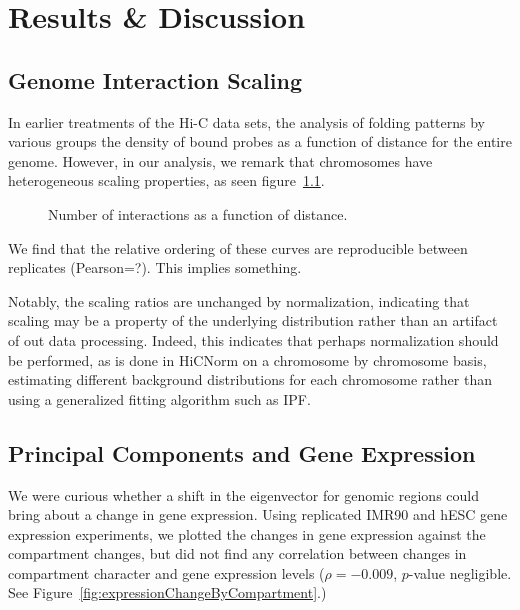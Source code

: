 \chapter{Results \& Discussion}

\section*{Genome Interaction Scaling}
In earlier treatments of the Hi-C data sets, the analysis of folding patterns by various groups \citep{imakaev2012} \citep{dixon2012}
the density of bound probes as a function of distance for the entire genome.  However, in our analysis, we remark that chromosomes
have heterogeneous scaling properties, as seen figure~\ref{fig:interactionScaling}.

\begin{figure}[h]
  \caption{Number of interactions as a function of distance.}\label{fig:interactionScaling}
\end{figure}

We find that the relative ordering of these curves are reproducible between replicates (Pearson=?).  This implies something.

Notably, the scaling ratios are unchanged by normalization, indicating that scaling may be a property of the underlying distribution
rather than an artifact of out data processing.  Indeed, this indicates that perhaps normalization should be performed, as is
done in HiCNorm \citep{hu2012} on a chromosome by chromosome basis, estimating different background distributions for each chromosome
rather than using a generalized fitting algorithm such as IPF\@.

\section*{Principal Components and Gene Expression}

We were curious whether a shift in the eigenvector for genomic regions could bring about a change in gene expression.  Using replicated
IMR90 and hESC gene expression experiments, we plotted the changes in gene expression against the compartment changes, but did not
find any correlation between changes in compartment character and gene expression levels ($\rho = -0.009$, $p$-value negligible.
See Figure~\ref{fig:expressionChangeByCompartment}.)

